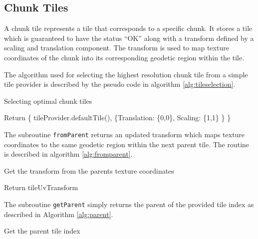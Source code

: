 \subsection{Chunk Tiles}

A chunk tile represents a tile that corresponds to a specific chunk. It stores a tile which is guaranteed to have the status ``OK'' along with a transform defined by a scaling and translation component. The transform is used to map texture coordinates of the chunk into its corresponding geodetic region within the tile. 

The algorithm used for selecting the highest resolution chunk tile from a simple tile provider is described by the pseudo code in algorithm \ref{alg:tileselection}.

\begin{algorithm}[htp]
 \caption{Selecting optimal chunk tiles}
  Return \{ tileProvider.defaultTile(), \{Translation: \{0,0\}, Scaling: \{1,1\} \} \}
  {}
  \label{alg:tileselection}
\end{algorithm}
 
The subroutine \texttt{fromParent} returns an updated transform which maps texture coordinates to the same geodetic region within the next parent tile. The routine is described in algorithm \ref{alg:fromparent}.

\begin{algorithm}[htp]
 \caption{Get the transform from the parents texture coordinates}
  Return tileUvTransform
  {}
  \label{alg:fromparent}
\end{algorithm}

The subroutine \texttt{getParent} simply returns the parent of the provided tile index as described in Algorithm \ref{alg:parent}.

\begin{algorithm}[htp]
 \caption{Get the parent tile index}
  \label{alg:parent}
\end{algorithm}

